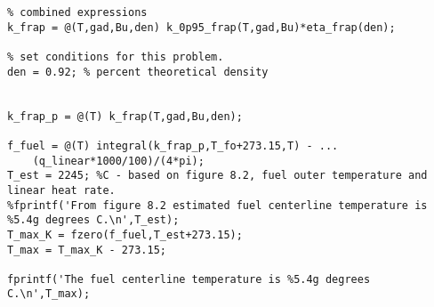 \begin{fullwidth}
\begin{lstlisting}
% combined expressions
k_frap = @(T,gad,Bu,den) k_0p95_frap(T,gad,Bu)*eta_frap(den);

% set conditions for this problem.
den = 0.92; % percent theoretical density


k_frap_p = @(T) k_frap(T,gad,Bu,den);

f_fuel = @(T) integral(k_frap_p,T_fo+273.15,T) - ...
    (q_linear*1000/100)/(4*pi);
T_est = 2245; %C - based on figure 8.2, fuel outer temperature and linear heat rate.
%fprintf('From figure 8.2 estimated fuel centerline temperature is %5.4g degrees C.\n',T_est);
T_max_K = fzero(f_fuel,T_est+273.15);
T_max = T_max_K - 273.15;

fprintf('The fuel centerline temperature is %5.4g degrees C.\n',T_max);
\end{lstlisting}
\end{fullwidth}

